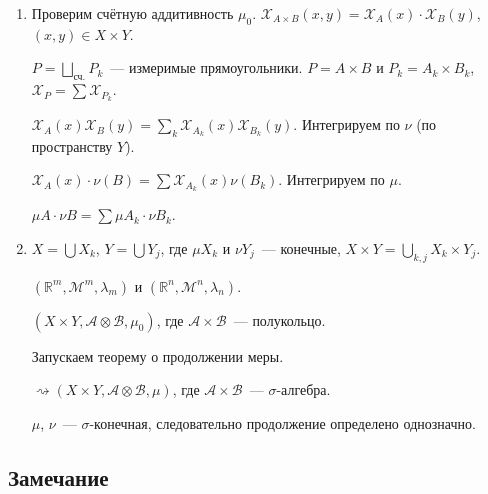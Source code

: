 \documentclass{article}
\begin{document}
            \begin{enumerate}
            
                \item 

                    Проверим счётную аддитивность $\mu_0$. $\mathcal{X}_{A \times B} (x, y) = \mathcal{X}_A(x) \cdot \mathcal{X}_B(y)$, $(x, y) \in X \times Y$.
            
                    $P = \bigsqcup\limits_{\text{сч.}} P_k$~--- измеримые прямоугольники. $P = A \times B$ и $P_k = A_k \times B_k$, $\mathcal{X}_P = \sum \mathcal{X}_{P_k}$.
            
                    $\mathcal{X}_A(x) \mathcal{X}_B(y) = \sum\limits_k \mathcal{X}_{A_k}(x) \mathcal{X}_{B_k}(y)$. Интегрируем по $\nu$ (по пространству $Y$).
            
                    $\mathcal{X}_A(x) \cdot \nu(B) = \sum \mathcal{X}_{A_k}(x) \nu (B_k)$. Интегрируем по $\mu$.
            
                    $\mu A \cdot \nu B = \sum \mu A_k \cdot \nu B_k$.
            
                \item
                
                    $X = \bigcup X_k$, $Y = \bigcup Y_j$, где $\mu X_k$ и $\nu Y_j$~--- конечные, $X \times Y = \bigcup\limits_{k, j} X_k \times Y_j$.
    
                    $\left( \mathbb{R}^m, \mathcal{M}^m, \lambda_m \right)$ и $\left( \mathbb{R}^n, \mathcal{M}^n, \lambda_n \right)$.
    
                    $\left( X \times Y, \mathcal{A} \otimes \mathcal{B}, \mu_0 \right)$, где $\mathcal{A} \times \mathcal{B}$~--- полукольцо.
    
                    Запускаем теорему о продолжении меры.
    
                    $\rightsquigarrow \left( X \times Y, \mathcal{A} \otimes \mathcal{B}, \mu \right)$, где $\mathcal{A} \times \mathcal{B}$~--- $\sigma$-алгебра.
    
                    $\mu$, $\nu$~--- $\sigma$-конечная, следовательно продолжение определено однозначно.
            
            \end{enumerate}
            
        \subsection{Замечание}
    
\end{document}
